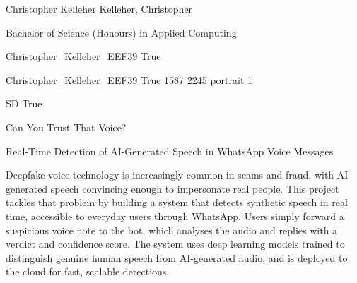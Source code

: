 
\begingroup{}\relax



\def\Key{Christopher_Kelleher_EEF39}

{Christopher Kelleher}
{Kelleher, Christopher}

{Bachelor of Science (Honours) in Applied Computing}

{Christopher_Kelleher_EEF39}
{True}

{Christopher_Kelleher_EEF39}
{True}
{1587}
{2245}
{portrait}
{1}

{SD}
{True}

{Can You Trust That Voice?}

{Real-Time Detection of AI-Generated Speech in WhatsApp Voice Messages}

{Deepfake voice technology is increasingly common in scams and fraud, with AI-generated 
speech convincing enough to impersonate real people. This project tackles that problem by 
building a system that detects synthetic speech in real time, accessible to everyday users 
through WhatsApp. Users simply forward a suspicious voice note to the bot, which analyses the 
audio and replies with a verdict and confidence score. The system uses deep learning 
models trained to distinguish genuine human speech from AI-generated audio, and is deployed 
to the cloud for fast, scalable detections.}

